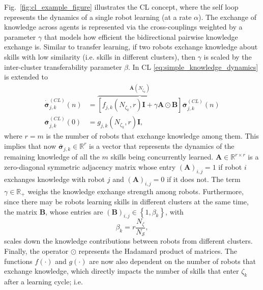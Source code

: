 Fig.~\ref{fig:cl_example_figure} illustrates the CL concept, where the self loop represents the dynamics of a single robot learning (at a rate $\alpha$). The exchange of knowledge across agents is represented via the cross-couplings weighted by a parameter $\gamma$ that models how efficient the bidirectional pairwise knowledge exchange is. Similar to transfer learning, if two robots exchange knowledge about skills with low similarity (i.e. skills in different clusters), then $\gamma$ is scaled by the inter-cluster transferability  parameter $\beta$. In CL \eqref{eq:simple_knowledge_dynamics} is extended to 
\begin{subequations}\label{eq:collective_knowledge_dynamics}
	\begin{alignat}{2}
		\dot{\bar{\bm{\sigma}}}^{(CL)}_{j,k}\left(n\right) &= \overbrace{\left[  f_{j,k}\left(N_{\zeta_k},r\right) \bm{I} + \gamma \bm{A} \odot \bm{B}  \right]}^{\bar{\bm{A}}\left(N_{\zeta_k}\right)} \bar{\bm{\sigma}}^{(CL)}_{j,k}\left(n\right)\\
		\bar{\bm{\sigma}}^{(CL)}_{j,k}(0) &= g_{j,k}\left( N_{\zeta_k}, r\right) \bm{I},
	\end{alignat}
\end{subequations}
where $r=m$ is the number of robots that exchange knowledge among them. This implies that now $\bar{\bm{\sigma}}^{}_{j,k} \in \mathbb{R}^r$ is a vector that represents the dynamics of the remaining knowledge of all the $m$ skills being concurrently learned. $\bm{A} \in \mathbb{R}^{r \times r}$ is a zero-diagonal symmetric adjacency matrix whose entry $(\bm{A})_{i,j} = 1$ if robot $i$ exchanges knowledge with robot $j$ and $(\bm{A})_{i,j} = 0$ if it does not. The term $\gamma \in \mathbb{R}_+ $ weighs the knowledge exchange strength among robots. Furthermore, since there may be robots learning skills in different clusters at the same time, the matrix $\bm{B}$, whose entries are $\left(\bm{B}\right)_{i,j} \in \left \lbrace 1, \beta_{k} \right \rbrace$, with
\begin{equation}
	\beta_{k} = r\frac{ N_\zeta}{N_\mathcal{S}}, 
\end{equation}
scales down the knowledge contributions between robots from different clusters. Finally, the operator $\odot$ represents the Hadamard product of matrices. The functions $ f(\cdot)$ and $g(\cdot)$ are now also dependent on the number of robots that exchange knowledge, which directly impacts the number of skills that enter $\zeta_k$ after a learning cycle; i.e.

